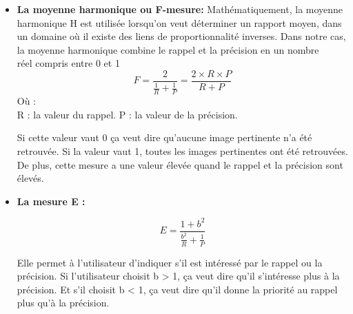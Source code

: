 \begin{itemize}
	\item \textbf{La moyenne harmonique ou F-mesure:} Mathématiquement, la moyenne 
	harmonique H est utilisée lorsqu'on
	veut déterminer un rapport moyen,
	dans un domaine où il existe des 
	liens de proportionnalité inverses.
	Dans notre cas, la moyenne harmonique
	combine le rappel et la précision en un
	nombre\\ réel compris entre 0 et 1 
	\begin{equation}
	    F = \frac{2}{\frac{1}{R}+\frac{1}{P}} = \frac{2\times R \times P}{R+P}
	\end{equation}
	Où :\\
	R : la valeur du rappel.  \space\space	P : la valeur de la précision.
	
	
	Si cette valeur vaut 0 ça veut dire
	qu’aucune image pertinente n’a été
	retrouvée. Si la valeur vaut 1, toutes
	les images pertinentes ont été
	retrouvées. De plus, cette mesure a 
	une valeur élevée quand le rappel et la
	précision sont élevés.
	
	\item\textbf{ La mesure E :}

	\begin{equation}
			 E = \frac{1+b^2}{\frac{b^2}{R}+\frac{1}{P}}
	\end{equation}
	
	Elle permet à l’utilisateur d’indiquer 
	s’il est intéressé par le rappel ou la précision.
	Si l’utilisateur choisit b > 1, ça veut dire qu’il s’intéresse plus à la précision.
	Et s’il choisit b < 1, ça veut dire qu’il donne la priorité au rappel plus qu’à la précision.    
\end{itemize}
		
